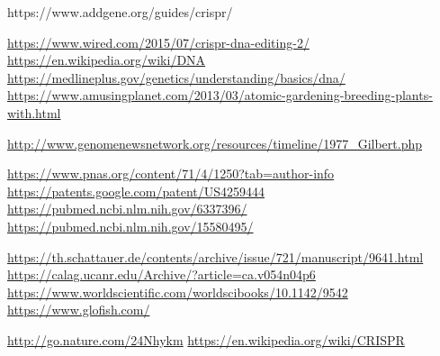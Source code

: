 \documentclass[12pt,a4paper,BCOR=.7cm,headsepline,bibliography=totoc]{report}
\begin{document}
\begin{thebibliography}{1}
\begin{latin}
 {https://www.addgene.org/guides/crispr/}

 {\href{https://www.wired.com/2015/07/crispr-dna-editing-2/}{\url{https://www.wired.com/2015/07/crispr-dna-editing-2/}}}
 {\href{https://en.wikipedia.org/wiki/DNA}{\url{https://en.wikipedia.org/wiki/DNA}}}
 {\href{https://medlineplus.gov/genetics/understanding/basics/dna/}{\url{https://medlineplus.gov/genetics/understanding/basics/dna/}}}
 {\href{https://www.amusingplanet.com/2013/03/atomic-gardening-breeding-plants-with.html}{\url{https://www.amusingplanet.com/2013/03/atomic-gardening-breeding-plants-with.html}}}

 {\href{http://www.genomenewsnetwork.org/resources/timeline/1977_Gilbert.php}{\url{http://www.genomenewsnetwork.org/resources/timeline/1977_Gilbert.php}}}

 {\href{https://www.pnas.org/content/71/4/1250?tab=author-info}{\url{https://www.pnas.org/content/71/4/1250?tab=author-info}}}
 {\href{https://patents.google.com/patent/US4259444}{\url{https://patents.google.com/patent/US4259444}}}
 {\href{https://pubmed.ncbi.nlm.nih.gov/6337396/}{\url{https://pubmed.ncbi.nlm.nih.gov/6337396/}}}
 {\href{https://pubmed.ncbi.nlm.nih.gov/15580495/}{\url{https://pubmed.ncbi.nlm.nih.gov/15580495/}}}

 {\href{https://th.schattauer.de/contents/archive/issue/721/manuscript/9641.html}{\url{https://th.schattauer.de/contents/archive/issue/721/manuscript/9641.html}}}
  {\href{https://calag.ucanr.edu/Archive/?article=ca.v054n04p6}{\url{https://calag.ucanr.edu/Archive/?article=ca.v054n04p6}}}
 {\href{https://www.worldscientific.com/worldscibooks/10.1142/9542}{\url{https://www.worldscientific.com/worldscibooks/10.1142/9542}}}
 {\href{https://www.glofish.com/}{\url{https://www.glofish.com/}}}

  {\href{http://go.nature.com/24Nhykm}{\url{http://go.nature.com/24Nhykm}}}
  {\href{https://en.wikipedia.org/wiki/CRISPR}{\url{https://en.wikipedia.org/wiki/CRISPR}}}


\end{latin}
\end{thebibliography}
\end{document}
